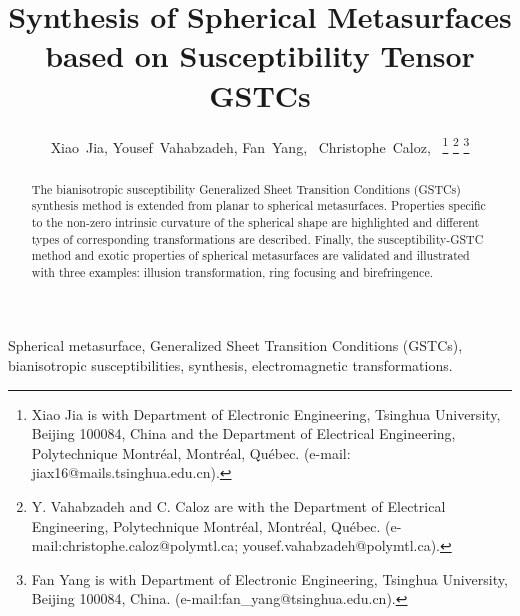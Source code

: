 \documentclass[journal,transaction]{IEEEtran}
\begin{document}
\title{Synthesis  of Spherical Metasurfaces \\ based on Susceptibility Tensor GSTCs }%

\author{Xiao~Jia,
        Yousef~Vahabzadeh,
        Fan~Yang,~
        Christophe~Caloz,~
\thanks{Xiao Jia is with Department of Electronic Engineering, Tsinghua University, Beijing 100084, China and the Department of Electrical Engineering, Polytechnique Montr\'{e}al, Montr\'{e}al, Qu\'{e}bec. (e-mail: jiax16@mails.tsinghua.edu.cn).}
\thanks{Y. Vahabzadeh and C. Caloz are with the Department of Electrical Engineering, Polytechnique Montr\'{e}al,
Montr\'{e}al, Qu\'{e}bec. (e-mail:christophe.caloz@polymtl.ca; yousef.vahabzadeh@polymtl.ca).}%
\thanks{Fan Yang is with Department of Electronic Engineering, Tsinghua University, Beijing 100084, China. (e-mail:fan\_yang@tsinghua.edu.cn).}
 }

\maketitle

\begin{abstract}
The bianisotropic susceptibility Generalized Sheet Transition Conditions (GSTCs) synthesis method is extended from planar to spherical metasurfaces. Properties specific to the non-zero intrinsic curvature of the spherical shape are highlighted and different types of corresponding transformations are described. Finally, the susceptibility-GSTC method and exotic properties of spherical metasurfaces are validated and illustrated with three examples: illusion transformation, ring focusing and birefringence.
\end{abstract}


\begin{IEEEkeywords}
Spherical metasurface, Generalized Sheet Transition Conditions (GSTCs), bianisotropic susceptibilities, synthesis, electromagnetic transformations.
\end{IEEEkeywords} %
\end{document}
